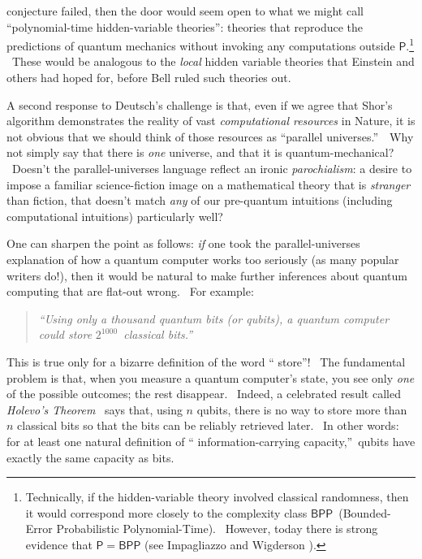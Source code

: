 \documentclass[11pt,onecolumn]{article}%
\begin{document}
conjecture failed, then the door would seem open to what we might call
\textquotedblleft polynomial-time hidden-variable theories\textquotedblright:
theories that reproduce the predictions of quantum mechanics without invoking
any computations outside $\mathsf{P}$.\footnote{Technically, if the
hidden-variable theory involved classical randomness, then it would correspond
more closely to the complexity class $\mathsf{BPP}$\ (Bounded-Error
Probabilistic Polynomial-Time). \ However, today there is strong evidence that
$\mathsf{P}=\mathsf{BPP}$ (see Impagliazzo and Wigderson \cite{iw}).} \ These
would be analogous to the \textit{local} hidden variable theories that
Einstein and others had hoped for, before Bell ruled such theories out.

A second response to Deutsch's challenge is that, even if we agree that Shor's
algorithm demonstrates the reality of vast \textit{computational resources} in
Nature, it is not obvious that we should think of those resources as
\textquotedblleft parallel universes.\textquotedblright\ \ Why not simply say
that there is \textit{one} universe, and that it is quantum-mechanical?
\ Doesn't the parallel-universes language reflect an ironic
\textit{parochialism}: a desire to impose a familiar science-fiction image on
a mathematical theory that is \textit{stranger} than fiction, that doesn't
match \textit{any} of our pre-quantum intuitions (including computational
intuitions) particularly well?

One can sharpen the point as follows: \textit{if} one took the
parallel-universes explanation of how a quantum computer works too seriously
(as many popular writers do!), then it would be natural to make further
inferences about quantum computing that are flat-out wrong. \ For example:

\begin{quotation}
\noindent\textit{\textquotedblleft Using only a thousand quantum bits (or
qubits), a quantum computer could store }$2^{1000}$\textit{\ classical
bits.\textquotedblright}
\end{quotation}

This is true only for a bizarre definition of the word \textquotedblleft
store\textquotedblright! \ The fundamental problem is that, when you measure a
quantum computer's state, you see only \textit{one} of the possible outcomes;
the rest disappear. \ Indeed, a celebrated result called \textit{Holevo's
Theorem} \cite{holevo}\ says that, using $n$ qubits, there is no way to store
more than $n$ classical bits so that the bits can be reliably retrieved later.
\ In other words: for at least one natural definition of \textquotedblleft
information-carrying capacity,\textquotedblright\ qubits have exactly the same
capacity as bits.
\end{document}
